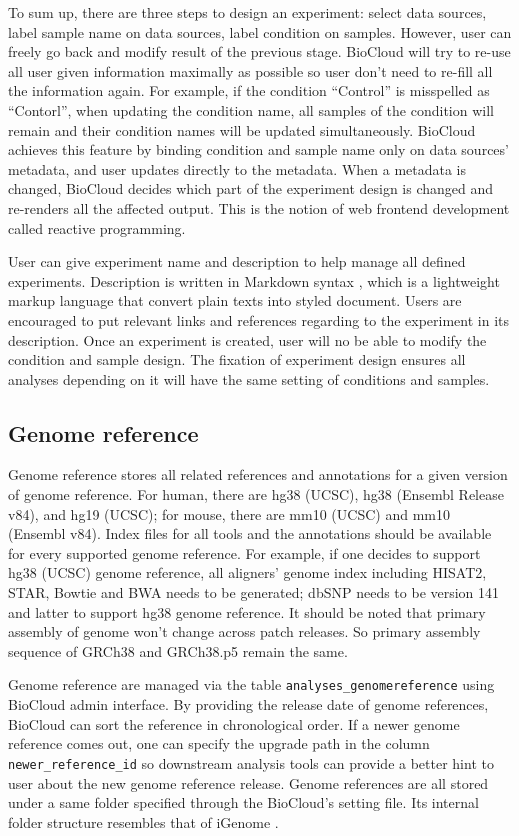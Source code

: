 To sum up, there are three steps to design an experiment: select data sources,
label sample name on data sources, label condition on samples. However, user
can freely go back and modify result of the previous stage. BioCloud will try
to re-use all user given information maximally as possible so user don't need
to re-fill all the information again. For example, if the condition ``Control''
is misspelled as ``Contorl'', when updating the condition name, all samples of
the condition will remain and their condition names will be updated
simultaneously. BioCloud achieves this feature by binding condition and sample
name only on data sources' metadata, and user updates directly to the metadata.
When a metadata is changed, BioCloud decides which part of the experiment
design is changed and re-renders all the affected output. This is the notion of
web frontend development called reactive programming.

User can give experiment name and description to help manage all defined
experiments. Description is written in Markdown syntax \cite{:commonmark},
which is a lightweight markup language that convert plain texts into styled
document. Users are encouraged to put relevant links and references regarding
to the experiment in its description. Once an experiment is created, user will
no be able to modify the condition and sample design. The fixation of
experiment design ensures all analyses depending on it will have the same
setting of conditions and samples.


\subsection{Genome reference}

Genome reference stores all related references and annotations for a given
version of genome reference. For human, there are hg38 (UCSC), hg38 (Ensembl
Release v84), and hg19 (UCSC); for mouse, there are mm10 (UCSC) and mm10
(Ensembl v84). Index files for all tools and the annotations should be
available for every supported genome reference. For example, if one decides to
support hg38 (UCSC) genome reference, all aligners' genome index including
HISAT2, STAR, Bowtie and BWA needs to be generated; dbSNP needs to be version
141 and latter to support hg38 genome reference. It should be noted that
primary assembly of genome won't change across patch releases. So primary
assembly sequence of GRCh38 and GRCh38.p5 remain the same.

Genome reference are managed via the table \texttt{analyses\_genomereference}
using BioCloud admin interface. By providing the release date of genome
references, BioCloud can sort the reference in chronological order. If a newer
genome reference comes out, one can specify the upgrade path in the column
\texttt{newer\_reference\_id} so downstream analysis tools can provide a better
hint to user about the new genome reference release. Genome references are all
stored under a same folder specified through the BioCloud's setting file. Its
internal folder structure resembles that of iGenome \cite{:igenomes}.


